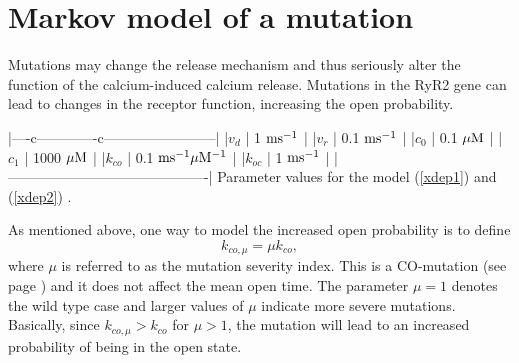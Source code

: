 \section{Markov model of a mutation}

Mutations may change the release mechanism and thus seriously alter the
function of the calcium-induced calcium release. Mutations in the RyR2
gene can lead to changes in the receptor function, increasing the open
probability. 

|----c-------------c------------------------|
|$v_d $    | 1 $\rm{ms^{-1}}$               |
|$v_r $    | 0.1 $\rm{ms^{-1}}$             |
|$c_0 $    | 0.1 $\rm{\mu M}$               |
|$c_1 $    | 1000 $\rm{\mu M}$              |
|$k_{co} $ | 0.1 $\rm{ms^{-1} \mu M^{-1}}$  |
|$k_{oc} $ | 1 $\rm{ms^{-1}}$               |
|-------------------------------------------|
Parameter values for the model (\ref{xdep1}) and (\ref{xdep2}) .\label{tab:xdep}

As mentioned above, one way to model the increased open probability
is to define
\begin{equation}
k_{co,\mu}=\mu k_{co}, \label{severity}
\end{equation}
where $\mu$ is referred to as the mutation severity index. This is a
CO-mutation (see page \pageref{com}) and it does not affect the mean open
time. The parameter $\mu=1$ denotes the wild type case and larger values of
$\mu$ indicate more severe mutations. Basically, since $k_{co,\mu}>k_{co} $
for $\mu>1$, the mutation will lead to an increased probability of being in the
open state.

